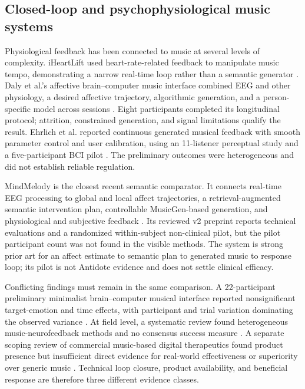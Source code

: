 \subsection{Closed-loop and psychophysiological music systems}
\label{sec:related-closed-loop}

Physiological feedback has been connected to music at several levels of
complexity. iHeartLift used heart-rate-related feedback to manipulate music
tempo, demonstrating a narrow real-time loop rather than a semantic generator
\citep{ho2011iheartlift}. Daly et al.'s affective brain--computer music
interface combined EEG and other physiology, a desired affective trajectory,
algorithmic generation, and a person-specific model across sessions
\citep{daly2016abcmi}. Eight participants completed its longitudinal protocol;
attrition, constrained generation, and signal limitations qualify the result.
Ehrlich et al. reported continuous generated musical feedback with smooth
parameter control and user calibration, using an 11-listener perceptual study
and a five-participant BCI pilot \citep{ehrlich2019closedloop}. The preliminary
outcomes were heterogeneous and did not establish reliable regulation.

MindMelody is the closest recent semantic comparator. It connects real-time
EEG processing to global and local affect trajectories, a retrieval-augmented
semantic intervention plan, controllable MusicGen-based generation, and
physiological and subjective feedback \citep{zhang2026mindmelody}. Its reviewed
v2 preprint reports technical evaluations and a randomized within-subject
non-clinical pilot, but the pilot participant count was not found in the
visible methods. The system is strong prior art for an affect estimate to
semantic plan to generated music to response loop; its pilot is not Antidote
evidence and does not settle clinical efficacy.

Conflicting findings must remain in the same comparison. A 22-participant
preliminary minimalist brain--computer musical interface reported
nonsignificant target-emotion and time effects, with participant and trial
variation dominating the observed variance \citep{monroy2026minimalist}.
At field level, a systematic review found heterogeneous music-neurofeedback
methods and no consensus success measure \citep{sayal2025musicloop}. A separate
scoping review of commercial music-based digital therapeutics found product
presence but insufficient direct evidence for real-world effectiveness or
superiority over generic music \citep{venkatesan2026mdt}. Technical loop
closure, product availability, and beneficial response are therefore three
different evidence classes.

